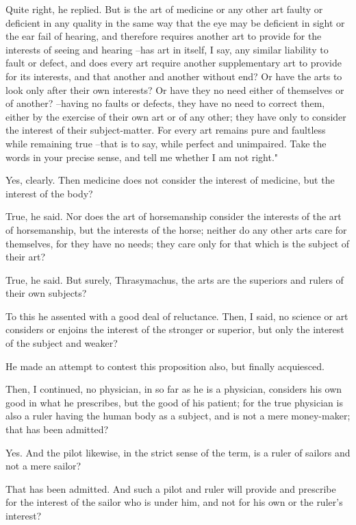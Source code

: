 Quite right, he replied.
But is the art of medicine or any other art faulty or deficient in any quality in the same way that the eye may be deficient in sight or the ear fail of hearing, and therefore requires another art to provide for the interests of seeing and hearing --has art in itself, I say, any similar liability to fault or defect, and does every art require another supplementary art to provide for its interests, and that another and another without end? Or have the arts to look only after their own interests? Or have they no need either of themselves or of another? --having no faults or defects, they have no need to correct them, either by the exercise of their own art or of any other; they have only to consider the interest of their subject-matter. For every art remains pure and faultless while remaining true --that is to say, while perfect and unimpaired. Take the words in your precise sense, and tell me whether I am not right."

Yes, clearly.
Then medicine does not consider the interest of medicine, but the interest of the body?

True, he said.
Nor does the art of horsemanship consider the interests of the art of horsemanship, but the interests of the horse; neither do any other arts care for themselves, for they have no needs; they care only for that which is the subject of their art?

True, he said.
But surely, Thrasymachus, the arts are the superiors and rulers of their own subjects?

To this he assented with a good deal of reluctance.
Then, I said, no science or art considers or enjoins the interest of the stronger or superior, but only the interest of the subject and weaker?

He made an attempt to contest this proposition also, but finally acquiesced.

Then, I continued, no physician, in so far as he is a physician, considers his own good in what he prescribes, but the good of his patient; for the true physician is also a ruler having the human body as a subject, and is not a mere money-maker; that has been admitted?

Yes.
And the pilot likewise, in the strict sense of the term, is a ruler of sailors and not a mere sailor?

That has been admitted.
And such a pilot and ruler will provide and prescribe for the interest of the sailor who is under him, and not for his own or the ruler's interest?

